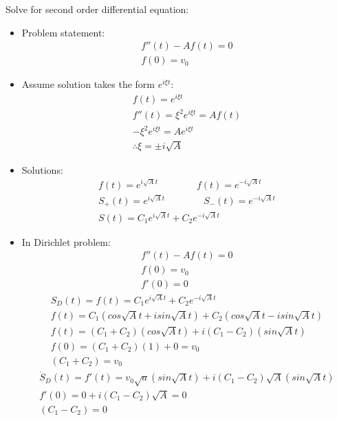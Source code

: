 \documentclass[12pt, a4paper]{article}
\begin{document}
Solve for second order differential equation:
\begin{itemize}
    \item Problem statement:
    \begin{gather*}
        f''(t) - Af(t) = 0 \\
        f(0) = v_0
    \end{gather*}
    \item Assume solution takes the form $e^{i\xi t}$:
    \begin{gather*}
        f(t) = e^{i\xi t} \\
        f''(t) = \xi^2e^{i\xi t} = Af(t) \\
        -\xi^2e^{i\xi t} = Ae^{i\xi t} \\
        \therefore \xi = \pm i \sqrt{A}
    \end{gather*}
    \item Solutions:
    \begin{gather*}
        f(t) = e^{i\sqrt{A}t} \qquad\qquad f(t) = e^{-i\sqrt{A}t} \\
        S_+(t) = e^{i\sqrt{A}t} \qquad\qquad S_-(t) = e^{-i\sqrt{A}t} \\
        S(t) = C_1e^{i\sqrt{A}t} + C_2e^{-i\sqrt{A}t}
    \end{gather*}
    \item In Dirichlet problem:
    \begin{gather*}
        f''(t) - Af(t) = 0 \\
        f(0) = v_0\\
        f'(0) = 0
    \end{gather*}
    \begin{gather*}
        S_D(t) = f(t) = C_1e^{i\sqrt{A}t} + C_2e^{-i\sqrt{A}t} \\
        f(t) = C_1(cos\sqrt{A}t + isin\sqrt{A}t) + C_2(cos\sqrt{A}t - isin\sqrt{A}t) \\
        f(t) = (C_1 + C_2)(cos\sqrt{A}t) + i(C_1-C_2)(sin\sqrt{A}t) \\
        f(0) = (C_1 + C_2)(1) + 0 = v_0\\
        (C_1 + C_2)= v_0 
    \end{gather*}
    \begin{gather*}
        \dot{S}_D(t) = f'(t) = v_0\sqrt{a}(sin\sqrt{A}t) + i(C_1-C_2)\sqrt{A}(sin\sqrt{A}t) \\
        f'(0) = 0 + i(C_1-C_2)\sqrt{A} =0 \\
        (C_1-C_2) = 0
    \end{gather*}
    \begin{gather*}

\end{gather*}
\end{itemize}
\end{document}
